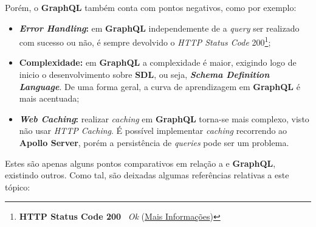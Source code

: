 Porém, o \textbf{GraphQL} também conta com pontos negativos, como por exemplo:

\begin{itemize}
	\item \textbf{\textit{Error Handling}:} em \textbf{GraphQL} independemente de a \textit{query} ser realizado com sucesso ou não, é sempre devolvido o \textit{HTTP Status Code} 200\footnote{\textbf{HTTP Status Code 200 \textemdash} ~\textit{Ok} (\href{https://developer.mozilla.org/pt-BR/docs/Web/HTTP/Status/200}{Mais Informações})};

	\item \textbf{Complexidade:} em \textbf{GraphQL} a complexidade é maior, exigindo logo de inicio o desenvolvimento sobre \textbf{SDL}, ou seja, \textbf{\textit{Schema Definition Language}}. De uma forma geral, a curva de aprendizagem em \textbf{GraphQL} é mais acentuada;

	\item \textbf{\textit{Web Caching}:} realizar \textit{caching} em \textbf{GraphQL} torna-se mais complexo, visto não usar \textit{HTTP Caching}. É possível implementar \textit{caching} recorrendo ao \textbf{Apollo Server}, porém  a persistência de \textit{queries} pode ser um problema.
\end{itemize}


Estes são apenas alguns pontos comparativos em relação a \textbf{} e \textbf{GraphQL}, existindo outros. Como tal, são deixadas algumas referências relativas a este tópico: \cite{graphQLisBest,graphqlVsRestWichIsBetter,difGraphQLvsRest,knowGraphQLvsRest,whatisGraphql,restfulVsGraphql}